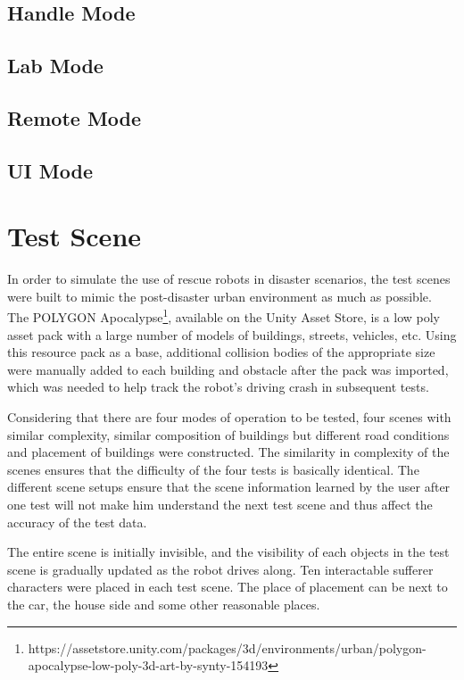 \subsection{Handle Mode}
\subsection{Lab Mode}
\subsection{Remote Mode}
\subsection{UI Mode}


\section{Test Scene}
In order to simulate the use of rescue robots in disaster scenarios, the test scenes were built to mimic the post-disaster urban environment as much as possible. The POLYGON Apocalypse\footnote{https://assetstore.unity.com/packages/3d/environments/urban/polygon-apocalypse-low-poly-3d-art-by-synty-154193}, available on the Unity Asset Store, is a low poly asset pack with a large number of models of buildings, streets, vehicles, etc. Using this resource pack as a base, additional collision bodies of the appropriate size were manually added to each building and obstacle after the pack was imported, which was needed to help track the robot's driving crash in subsequent tests.

Considering that there are four modes of operation to be tested, four scenes with similar complexity, similar composition of buildings but different road conditions and placement of buildings were constructed. The similarity in complexity of the scenes ensures that the difficulty of the four tests is basically identical. The different scene setups ensure that the scene information learned by the user after one test will not make him understand the next test scene and thus affect the accuracy of the test data. 

The entire scene is initially invisible, and the visibility of each objects in the test scene is gradually updated as the robot drives along. Ten interactable sufferer characters were placed in each test scene. The place of placement can be next to the car, the house side and some other reasonable places.
